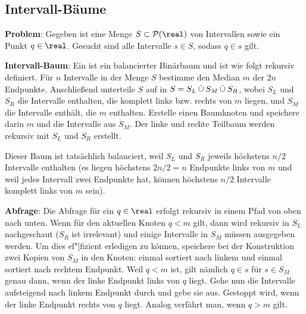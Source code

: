 \pagebreak

\subsection{%
    Intervall-Bäume%
}

\textbf{Problem}:
Gegeben ist eine Menge $S \subset \P(\real)$ von Intervallen sowie ein Punkt $q \in \real$.
Gesucht sind alle Intervalle $s \in S$, sodass $q \in s$ gilt.


\textbf{Intervall-Baum}:
Ein  ist ein balancierter Binärbaum und ist wie folgt rekursiv definiert.
Für $n$ Intervalle in der Menge $S$ bestimme den Median $m$ der $2n$ Endpunkte.
Anschließend unterteile $S$ auf in $S = S_L \mathbin{\dot{\cup}} S_M \mathbin{\dot{\cup}} S_R$,
wobei $S_L$ und $S_R$ die Intervalle enthalten, die komplett links bzw. rechts von $m$ liegen,
und $S_M$ die Intervalle enthält, die $m$ enthalten.
Erstelle einen Baumknoten und speichere darin $m$ und die Intervalle aus $S_M$.
Der linke und rechte Teilbaum werden rekursiv mit $S_L$ und $S_R$ erstellt.

Dieser Baum ist tatsächlich balanciert, weil $S_L$ und $S_R$ jeweils höchstens $n/2$
Intervalle enthalten
(es liegen höchstens $2n/2 = n$ Endpunkte links von $m$ und
weil jedes Intervall zwei Endpunkte hat,
können höchstens $n/2$ Intervalle komplett links von $m$ sein).

\linie

\textbf{Abfrage}:
Die Abfrage für ein $q \in \real$ erfolgt rekursiv in einem Pfad von oben nach unten.
Wenn für den aktuellen Knoten $q < m$ gilt, dann wird rekursiv in $S_L$ nachgeschaut
($S_R$ ist irrelevant) und einige Intervalle in $S_M$ müssen ausgegeben werden.
Um dies ef"|fizient erledigen zu können, speichere bei der Konstruktion
zwei Kopien von $S_M$ in den Knoten:
einmal sortiert nach linkem und einmal sortiert nach rechtem Endpunkt.
Weil $q < m$ ist, gilt nämlich $q \in s$ für $s \in S_M$ genau dann, wenn der linke Endpunkt
links von $q$ liegt.
Gehe nun die Intervalle aufsteigend nach linkem Endpunkt durch und gebe sie aus.
Gestoppt wird, wenn der linke Endpunkt rechts von $q$ liegt.
Analog verfährt man, wenn $q > m$ gilt.


